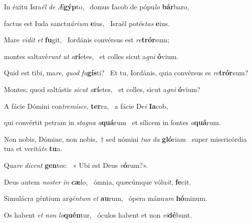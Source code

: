 \item In éxitu Isra\textit{ël} \textit{de} \textit{Æ}\textbf{gýp}to,~\psstar{} domus Iacob de pópu\textit{lo} \textbf{bár}baro,

\item factus est Iuda sanctu\textit{árium} \textbf{e}ius,~\psstar{} Israël potés\textit{tas} \textbf{e}ius.

\item Mare \textit{vidit} \textit{et} \textbf{fu}git,~\psstar{} Iordánis convérsus est \textit{re}\textbf{trór}sum;

\item montes saltavé\textit{runt} \textit{ut} \textit{a}\textbf{rí}etes,~\psstar{} et colles sicut a\textit{gni} \textbf{ó}vium.

\item Quid est tibi, ma\textit{re}, \textit{quod} \textit{fu}\textbf{gís}ti?~\psstar{} Et tu, Iordánis, quia convérsus es \textit{re}\textbf{trór}sum?

\item Montes, quod saltástis \textit{sicut} \textit{a}\textbf{rí}etes,~\psstar{} et colles, sicut a\textit{gni} \textbf{ó}vium?

\item A fácie Dómini con\textit{tremísce}, \textbf{ter}ra,~\psstar{} a fácie De\textit{i} \textbf{Ia}cob,

\item qui convértit petram in \textit{stagna} \textit{a}\textbf{quá}rum~\psstar{} et sílicem in fontes \textit{a}\textbf{quá}rum.

\item Non nobis, Dómine, non nobis,~† sed nómini \textit{tuo} \textit{da} \textbf{gló}riam~\psstar{} super misericórdia tua et veritá\textit{te} \textbf{tu}a.

\item Qua\textit{re} \textit{dicent} \textbf{gen}tes:~\psstar{} « Ubi est Deus \textit{e}\textbf{ó}rum?».

\item Deus autem \textit{noster} \textit{in} \textbf{cæ}lo,~\psstar{} ómnia, quæcúmque vólu\textit{it}, \textbf{fe}cit.

\item Simulácra géntium ar\textit{géntum} \textit{et} \textbf{au}rum,~\psstar{} ópera mánu\textit{um} \textbf{hó}minum.

\item Os habent \textit{et} \textit{non} \textit{lo}\textbf{quén}tur,~\psstar{} óculos habent et non \textit{vi}\textbf{dé}bunt.

